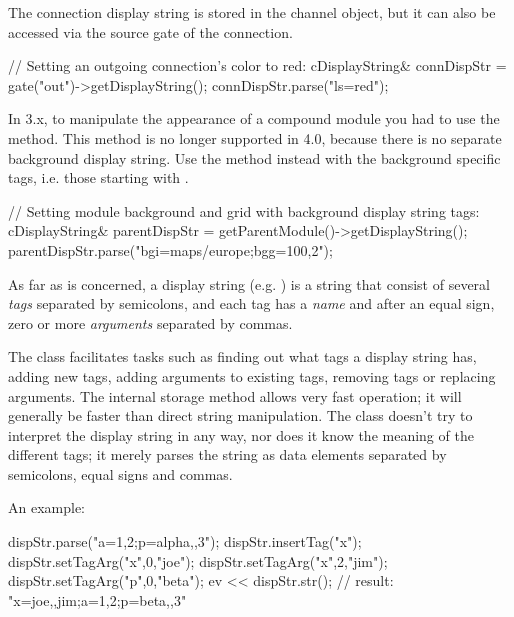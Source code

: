 \begin{note}
The connection display string is stored in the channel object, but it
can also be accessed via the source gate of the connection.
\end{note}

\begin{cpp}
// Setting an outgoing connection's color to red:
cDisplayString& connDispStr = gate("out")->getDisplayString();
connDispStr.parse("ls=red");
\end{cpp}

\begin{note}
In {\opp} 3.x, to manipulate the appearance of a compound module you had to use
the  method. This method is no longer
supported in {\opp} 4.0, because there is no separate background display string.
Use the  method instead with the background
specific tags, i.e. those starting with .
\end{note}

\begin{cpp}
// Setting module background and grid with background display string tags:
cDisplayString& parentDispStr = getParentModule()->getDisplayString();
parentDispStr.parse("bgi=maps/europe;bgg=100,2");
\end{cpp}

As far as  is concerned, a display string
(e.g. ) is a string that consist of several
\textit{tags} separated by semicolons, and each tag has a \textit{name}
and after an equal sign, zero or more \textit{arguments} separated by commas.

The class facilitates tasks such as finding out what tags a display string
has, adding new tags, adding arguments to existing tags,
removing tags or replacing arguments. The internal storage method allows
very fast operation; it will generally be faster than direct string manipulation.
The class doesn't try to interpret the display string in any way, nor does
it know the meaning of the different tags; it merely parses the string
as data elements separated by semicolons, equal signs and commas.

An example:

\begin{cpp}
dispStr.parse("a=1,2;p=alpha,,3");
dispStr.insertTag("x");
dispStr.setTagArg("x",0,"joe");
dispStr.setTagArg("x",2,"jim");
dispStr.setTagArg("p",0,"beta");
ev << dispStr.str();  // result: "x=joe,,jim;a=1,2;p=beta,,3"
\end{cpp}

